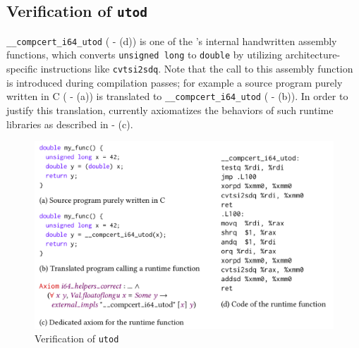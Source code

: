 \subsection{Verification of \texttt{utod}}
\label{sec:program:solution:utod}
\verb|__compcert_i64_utod| ( - (d)) is one of the \cc{}'s internal handwritten
assembly functions, which converts \verb|unsigned long| to
\verb|double| by utilizing architecture-specific instructions like
\verb|cvtsi2sdq|.
Note that the call to this assembly function is introduced during compilation passes; for example a source program purely written in C ( - (a)) is translated to \verb|__compcert_i64_utod| ( - (b)).
In order to justify this translation, \cc{} currently axiomatizes the behaviors of such runtime libraries as described in  - (c).

\begin{figure}[t]
\includegraphics[width=1\linewidth]{images/utod.png}
\caption{Verification of \texttt{utod}}
\label{fig:utod}
\end{figure}




